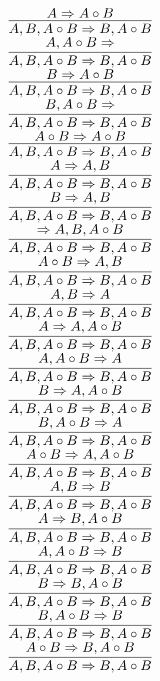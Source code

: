 \documentclass[11pt]{article}
\begin{document}
\begin{center}
\bigskip
\\$\infer{A, B, A\circ B\Rightarrow B, A\circ B}{A\Rightarrow A\circ B}$
\bigskip
\\$\infer{A, B, A\circ B\Rightarrow B, A\circ B}{A, A\circ B\Rightarrow }$
\bigskip
\\$\infer{A, B, A\circ B\Rightarrow B, A\circ B}{B\Rightarrow A\circ B}$
\bigskip
\\$\infer{A, B, A\circ B\Rightarrow B, A\circ B}{B, A\circ B\Rightarrow }$
\bigskip
\\$\infer{A, B, A\circ B\Rightarrow B, A\circ B}{A\circ B\Rightarrow A\circ B}$
\bigskip
\\$\infer{A, B, A\circ B\Rightarrow B, A\circ B}{A\Rightarrow A, B}$
\bigskip
\\$\infer{A, B, A\circ B\Rightarrow B, A\circ B}{B\Rightarrow A, B}$
\bigskip
\\$\infer{A, B, A\circ B\Rightarrow B, A\circ B}{\Rightarrow A, B, A\circ B}$
\bigskip
\\$\infer{A, B, A\circ B\Rightarrow B, A\circ B}{A\circ B\Rightarrow A, B}$
\bigskip
\\$\infer{A, B, A\circ B\Rightarrow B, A\circ B}{A, B\Rightarrow A}$
\bigskip
\\$\infer{A, B, A\circ B\Rightarrow B, A\circ B}{A\Rightarrow A, A\circ B}$
\bigskip
\\$\infer{A, B, A\circ B\Rightarrow B, A\circ B}{A, A\circ B\Rightarrow A}$
\bigskip
\\$\infer{A, B, A\circ B\Rightarrow B, A\circ B}{B\Rightarrow A, A\circ B}$
\bigskip
\\$\infer{A, B, A\circ B\Rightarrow B, A\circ B}{B, A\circ B\Rightarrow A}$
\bigskip
\\$\infer{A, B, A\circ B\Rightarrow B, A\circ B}{A\circ B\Rightarrow A, A\circ B}$
\bigskip
\\$\infer{A, B, A\circ B\Rightarrow B, A\circ B}{A, B\Rightarrow B}$
\bigskip
\\$\infer{A, B, A\circ B\Rightarrow B, A\circ B}{A\Rightarrow B, A\circ B}$
\bigskip
\\$\infer{A, B, A\circ B\Rightarrow B, A\circ B}{A, A\circ B\Rightarrow B}$
\bigskip
\\$\infer{A, B, A\circ B\Rightarrow B, A\circ B}{B\Rightarrow B, A\circ B}$
\bigskip
\\$\infer{A, B, A\circ B\Rightarrow B, A\circ B}{B, A\circ B\Rightarrow B}$
\bigskip
\\$\infer{A, B, A\circ B\Rightarrow B, A\circ B}{A\circ B\Rightarrow B, A\circ B}$

\end{center}
\end{document}
